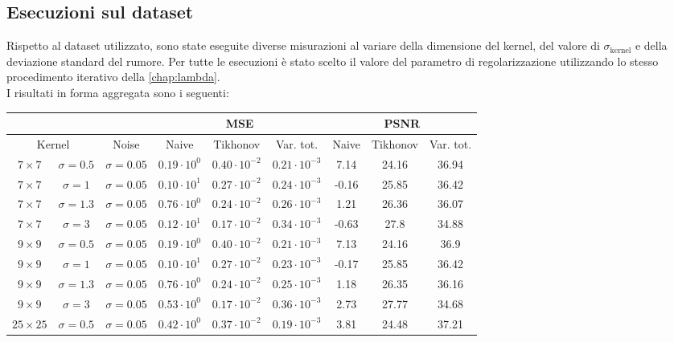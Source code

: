 \documentclass[11pt]{article}
\begin{document}
\subsection{Esecuzioni sul dataset}
Rispetto al dataset utilizzato, sono state eseguite diverse misurazioni al variare della dimensione del kernel, del valore di $\sigma_{\text{kernel}}$ e della deviazione standard del rumore. 
Per tutte le esecuzioni è stato scelto il valore del parametro di regolarizzazione utilizzando lo stesso procedimento iterativo della \autoref{chap:lambda}.\\
I risultati in forma aggregata sono i seguenti:
\begin{center}
    \begin{tabular}{ |cc|c|c|c|c|c|c|c| }
    \hline
    & & & \multicolumn{3}{c|}{MSE} & \multicolumn{3}{c|}{PSNR} \\
    \hline
    \multicolumn{2}{|c|}{Kernel} & Noise & Naive & Tikhonov & Var. tot. & Naive & Tikhonov & Var. tot. \\ 
    \hline
	$7 \times 7$ & $\sigma=0.5$ & $\sigma=0.05$ & $0.19 \cdot 10^{0}$ & $0.40 \cdot 10^{-2}$ & $0.21 \cdot 10^{-3}$ & 7.14 & 24.16 & 36.94 \\
	$7 \times 7$ & $\sigma=1$ & $\sigma=0.05$ & $0.10 \cdot 10^{1}$ & $0.27 \cdot 10^{-2}$ & $0.24 \cdot 10^{-3}$ & -0.16 & 25.85 & 36.42 \\
    $7 \times 7$ & $\sigma=1.3$ & $\sigma=0.05$ & $0.76 \cdot 10^{0}$ & $0.24 \cdot 10^{-2}$ & $0.26 \cdot 10^{-3}$ & 1.21 & 26.36 & 36.07 \\
    $7 \times 7$ & $\sigma=3$ & $\sigma=0.05$ & $0.12 \cdot 10^{1}$ & $0.17 \cdot 10^{-2}$ & $0.34 \cdot 10^{-3}$ & -0.63 & 27.8 & 34.88 \\
	\hline
    $9 \times 9$ & $\sigma=0.5$ & $\sigma=0.05$ & $0.19 \cdot 10^{0}$ & $0.40 \cdot 10^{-2}$ & $0.21 \cdot 10^{-3}$ & 7.13 & 24.16 & 36.9 \\
	$9 \times 9$ & $\sigma=1$ & $\sigma=0.05$ & $0.10 \cdot 10^{1}$ & $0.27 \cdot 10^{-2}$ & $0.23 \cdot 10^{-3}$ & -0.17 & 25.85 & 36.42 \\
	$9 \times 9$ & $\sigma=1.3$ & $\sigma=0.05$ & $0.76 \cdot 10^{0}$ & $0.24 \cdot 10^{-2}$ & $0.25 \cdot 10^{-3}$ & 1.18 & 26.35 & 36.16 \\
    $9 \times 9$ & $\sigma=3$ & $\sigma=0.05$ & $0.53 \cdot 10^{0}$ & $0.17 \cdot 10^{-2}$ & $0.36 \cdot 10^{-3}$ & 2.73 & 27.77 & 34.68 \\
    \hline
    $25 \times 25$ & $\sigma=0.5$ & $\sigma=0.05$ & $0.42 \cdot 10^{0}$ & $0.37 \cdot 10^{-2}$ & $0.19 \cdot 10^{-3}$ & 3.81 & 24.48 & 37.21 \\

\end{tabular}
\end{center}
\end{document}
